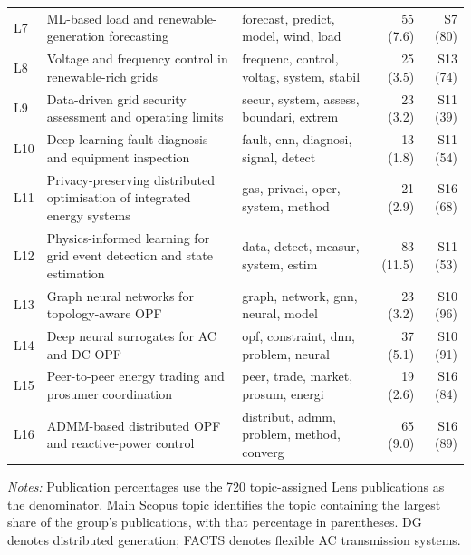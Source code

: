 \documentclass[a4paper,fleqn]{cas-sc}
\begin{document}
\begin{table}[p]
\begin{tabularx}{\textwidth}{
    l
    >{\raggedright\arraybackslash}X
    >{\raggedright\arraybackslash}X
    rr}
    L7 & ML-based load and renewable-generation forecasting
    & forecast, predict, model, wind, load
    & 55 (7.6) & S7 (80) \\
    
    L8 & Voltage and frequency control in renewable-rich grids
    & frequenc, control, voltag, system, stabil
    & 25 (3.5) & S13 (74) \\
    
    L9 & Data-driven grid security assessment and operating limits
    & secur, system, assess, boundari, extrem
    & 23 (3.2) & S11 (39) \\
    
    L10 & Deep-learning fault diagnosis and equipment inspection
    & fault, cnn, diagnosi, signal, detect
    & 13 (1.8) & S11 (54) \\
    
    L11 & Privacy-preserving distributed optimisation of integrated energy systems
    & gas, privaci, oper, system, method
    & 21 (2.9) & S16 (68) \\
    
    L12 & Physics-informed learning for grid event detection and state estimation
    & data, detect, measur, system, estim
    & 83 (11.5) & S11 (53) \\
    
    L13 & Graph neural networks for topology-aware OPF
    & graph, network, gnn, neural, model
    & 23 (3.2) & S10 (96) \\
    
    L14 & Deep neural surrogates for AC and DC OPF
    & opf, constraint, dnn, problem, neural
    & 37 (5.1) & S10 (91) \\
    
    L15 & Peer-to-peer energy trading and prosumer coordination
    & peer, trade, market, prosum, energi
    & 19 (2.6) & S16 (84) \\
    
    L16 & ADMM-based distributed OPF and reactive-power control
    & distribut, admm, problem, method, converg
    & 65 (9.0) & S16 (89) \\
    
    \bottomrule
    \end{tabularx}
    \par\smallskip
    \begin{minipage}{\textwidth}
    \footnotesize
    \textit{Notes:} Publication percentages use the 720 topic-assigned Lens publications as the denominator. Main Scopus topic identifies the topic containing the largest share of the group's publications, with that percentage in parentheses. DG denotes distributed generation; FACTS denotes flexible AC transmission systems.
    \end{minipage}
    \end{table}
    
\end{document}
